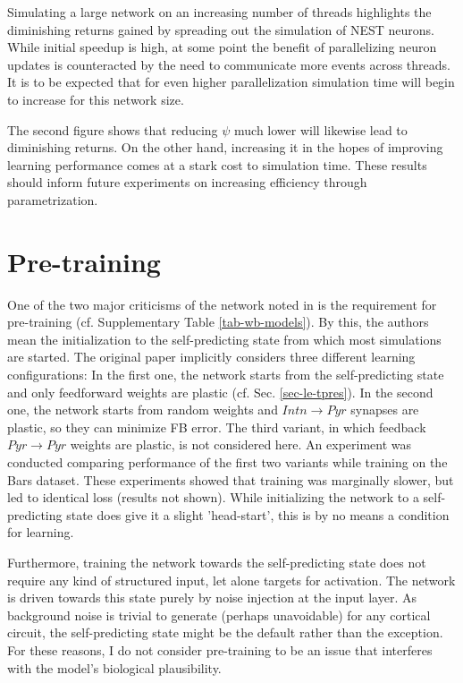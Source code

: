 Simulating a large network on an increasing number of threads highlights the diminishing returns gained by spreading out
the simulation of NEST neurons. While initial speedup is high, at some point the benefit of parallelizing neuron updates
is counteracted by the need to communicate more events across threads. It is to be expected that for even higher
parallelization simulation time will begin to increase for this network size.

The second figure shows that reducing $\psi$ much lower will likewise lead to diminishing returns. On the other hand,
increasing it in the hopes of improving learning performance comes at a stark cost to simulation time. These results
should inform future experiments on increasing efficiency through parametrization.

\section{Pre-training}

One of the two major criticisms of the network noted in \citep{whittington2019theories} is the requirement for
pre-training (cf. Supplementary Table \ref{tab-wb-models}). By this, the authors mean the initialization to the
self-predicting state from which most simulations are started. The original paper implicitly considers three different
learning configurations: In the first one, the network starts from the self-predicting state and only feedforward
weights are plastic (cf. Sec. \ref{sec-le-tpres}). In the second one, the network starts from random weights and $Intn
\rightarrow Pyr$ synapses are plastic, so they can minimize FB error. The third variant, in which feedback $Pyr
\rightarrow Pyr$ weights are plastic, is not considered here. An experiment was conducted comparing performance of the
first two variants while training on the Bars dataset. These experiments showed that training was marginally slower, but
led to identical loss (results not shown). While initializing the network to a self-predicting state does give it a
slight 'head-start', this is by no means a condition for learning.

Furthermore, training the network towards the self-predicting state does not require any kind of structured input, let
alone targets for activation. The network is driven towards this state purely by noise injection at the input layer. As
background noise is trivial to generate (perhaps unavoidable) for any cortical circuit, the self-predicting state might
be the default rather than the exception. For these reasons, I do not consider pre-training to be an issue that
interferes with the model's biological plausibility.


